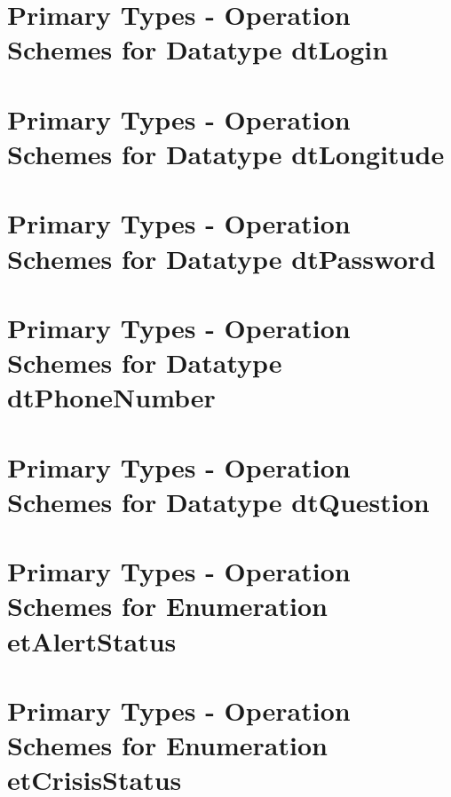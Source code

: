 \section{Primary Types - Operation Schemes for Datatype dtLogin} 
\label{OM-CM-PTDataType-dtLogin}

\section{Primary Types - Operation Schemes for Datatype dtLongitude} 
\label{OM-CM-PTDataType-dtLongitude}

\section{Primary Types - Operation Schemes for Datatype dtPassword} 
\label{OM-CM-PTDataType-dtPassword}

\section{Primary Types - Operation Schemes for Datatype dtPhoneNumber} 
\label{OM-CM-PTDataType-dtPhoneNumber}

\section{Primary Types - Operation Schemes for Datatype dtQuestion} 
\label{OM-CM-PTDataType-dtQuestion}






\section{Primary Types - Operation Schemes for Enumeration etAlertStatus} 
\label{OM-CM-PTEnumType-etAlertStatus}

\section{Primary Types - Operation Schemes for Enumeration etCrisisStatus} 
\label{OM-CM-PTEnumType-etCrisisStatus}

